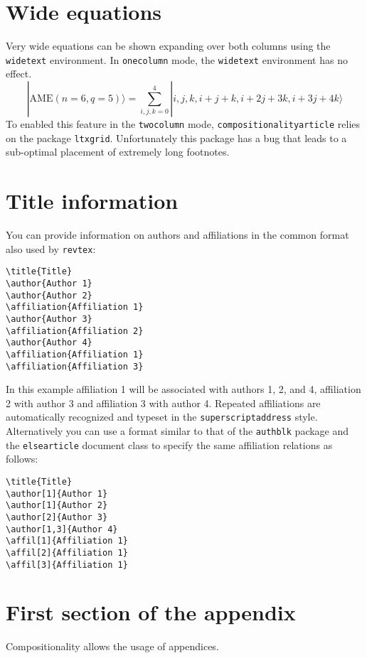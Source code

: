 \documentclass[
    accepted=2020-05-01,
    published=true,
    issue=1, 
    volume=2, 
    a4paper,
]{compositionalityarticle}
\newenvironment{widetext}{}{}
\begin{document}
\section{Wide equations}
Very wide equations can be shown expanding over both columns using the \texttt{widetext} environment.
In \texttt{onecolumn} mode, the \texttt{widetext} environment has no effect.
\begin{widetext}
  \begin{equation}
|\mathrm{AME}(n=6,q=5)\rangle=\sum_{i,j,k=0}^4 |i,j,k,i+j+k,i+2j+3k,i+3j+4k\rangle
  \end{equation}
\end{widetext}
To enabled this feature in the \texttt{twocolumn} mode, \texttt{compositionalityarticle} relies on the package \texttt{ltxgrid}.
Unfortunately this package has a bug that leads to a sub-optimal placement of extremely long footnotes.

\section{Title information}
You can provide information on authors and affiliations in the common format also used by \texttt{revtex}:
\begin{verbatim}
\title{Title}
\author{Author 1}
\author{Author 2}
\affiliation{Affiliation 1}
\author{Author 3}
\affiliation{Affiliation 2}
\author{Author 4}
\affiliation{Affiliation 1}
\affiliation{Affiliation 3}
\end{verbatim}
In this example affiliation 1 will be associated with authors 1, 2, and 4, affiliation 2 with author 3 and affiliation 3 with author 4.
Repeated affiliations are automatically recognized and typeset in the \texttt{superscriptaddress} style.
Alternatively you can use a format similar to that of the \texttt{authblk} package and the \texttt{elsearticle} document class to specify the same affiliation relations as follows:
\begin{verbatim}
\title{Title}
\author[1]{Author 1}
\author[1]{Author 2}
\author[2]{Author 3}
\author[1,3]{Author 4}
\affil[1]{Affiliation 1}
\affil[2]{Affiliation 1}
\affil[3]{Affiliation 1}
\end{verbatim}






\appendix

\section{First section of the appendix}
Compositionality allows the usage of appendices.
\end{document}
